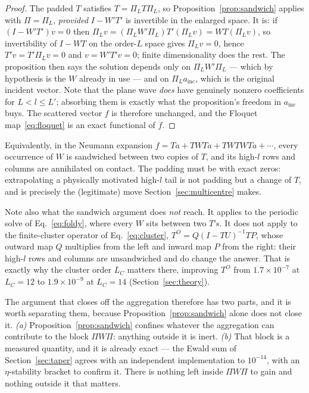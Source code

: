 \documentclass[11pt,a4paper]{article}
\theoremstyle{plain}
\theoremstyle{definition}
\begin{document}
\begin{proof}
The padded $T$ satisfies $T = \Pi_L T \Pi_L$, so Proposition~\ref{prop:sandwich}
applies with $\Pi = \Pi_L$, \emph{provided} $I - W'T'$ is invertible in the enlarged
space. It is: if $(I - W'T')v = 0$ then $\Pi_L v = (\Pi_L W' \Pi_L) T' (\Pi_L v) =
W T (\Pi_L v)$, so invertibility of $I - WT$ on the order-$L$ space gives
$\Pi_L v = 0$, hence $T'v = T' \Pi_L v = 0$ and $v = W'T'v = 0$; finite
dimensionality does the rest. The proposition then says the solution depends only
on $\Pi_L W' \Pi_L$ --- which by hypothesis is the $W$ already in use --- and on
$\Pi_L a_{\text{inc}}$, which is the original incident vector. Note that the plane
wave \emph{does} have genuinely nonzero coefficients for $L < l \le L'$; absorbing
them is exactly what the proposition's freedom in $a_{\text{inc}}$ buys. The
scattered vector $f$ is therefore unchanged, and the Floquet
map~\eqref{eq:floquet} is an exact functional of $f$.
\end{proof}

Equivalently, in the Neumann expansion
$f = Ta + TWTa + TWTWTa + \cdots$, every occurrence of $W$ is sandwiched between
two copies of $T$, and its high-$l$ rows and columns are annihilated on contact.
The padding must be with exact zeros: extrapolating a physically motivated
high-$l$ tail is not padding but a change of $T$, and is precisely the (legitimate)
move Section~\ref{sec:multicentre} makes.

Note also what the sandwich argument does \emph{not} reach. It applies to the
periodic solve of Eq.~\eqref{eq:foldy}, where every $W$ sits between two $T$'s.
It does not apply to the finite-cluster operator of Eq.~\eqref{eq:cluster},
$T^{O} = Q(I - TU)^{-1}TP$, whose outward map $Q$ multiplies from the left and
inward map $P$ from the right: their high-$l$ rows and columns are unsandwiched
and do change the answer. That is exactly why the cluster order $L_C$ matters
there, improving $T^{O}$ from $1.7\times10^{-7}$ at $L_C = 12$ to
$1.9\times10^{-9}$ at $L_C = 14$ (Section~\ref{sec:theory}).

The argument that closes off the aggregation therefore has two parts, and it is
worth separating them, because Proposition~\ref{prop:sandwich} alone does not
close it. \emph{(a)} Proposition~\ref{prop:sandwich} confines whatever the
aggregation can contribute to the block $\Pi W \Pi$: anything outside it is inert.
\emph{(b)} That block is a measured quantity, and it is already exact --- the
Ewald sum of Section~\ref{sec:taper} agrees with an independent implementation to
$10^{-14}$, with an $\eta$-stability bracket to confirm it. There is nothing left
inside $\Pi W \Pi$ to gain and nothing outside it that matters.
\end{document}

